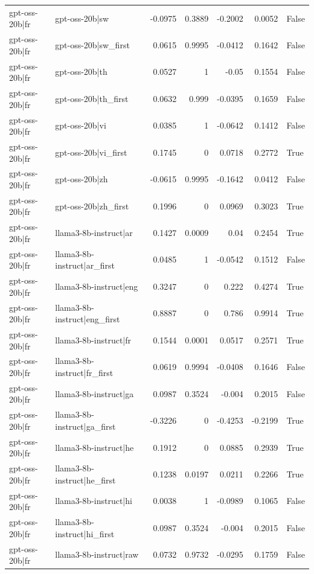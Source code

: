 \begin{table}
\begin{tabular}{l l r r r r l}
gpt-oss-20b|fr & gpt-oss-20b|sw & -0.0975 & 0.3889 & -0.2002 & 0.0052 & False \\
gpt-oss-20b|fr & gpt-oss-20b|sw_first & 0.0615 & 0.9995 & -0.0412 & 0.1642 & False \\
gpt-oss-20b|fr & gpt-oss-20b|th & 0.0527 & 1 & -0.05 & 0.1554 & False \\
gpt-oss-20b|fr & gpt-oss-20b|th_first & 0.0632 & 0.999 & -0.0395 & 0.1659 & False \\
gpt-oss-20b|fr & gpt-oss-20b|vi & 0.0385 & 1 & -0.0642 & 0.1412 & False \\
gpt-oss-20b|fr & gpt-oss-20b|vi_first & 0.1745 & 0 & 0.0718 & 0.2772 & True \\
gpt-oss-20b|fr & gpt-oss-20b|zh & -0.0615 & 0.9995 & -0.1642 & 0.0412 & False \\
gpt-oss-20b|fr & gpt-oss-20b|zh_first & 0.1996 & 0 & 0.0969 & 0.3023 & True \\
gpt-oss-20b|fr & llama3-8b-instruct|ar & 0.1427 & 0.0009 & 0.04 & 0.2454 & True \\
gpt-oss-20b|fr & llama3-8b-instruct|ar_first & 0.0485 & 1 & -0.0542 & 0.1512 & False \\
gpt-oss-20b|fr & llama3-8b-instruct|eng & 0.3247 & 0 & 0.222 & 0.4274 & True \\
gpt-oss-20b|fr & llama3-8b-instruct|eng_first & 0.8887 & 0 & 0.786 & 0.9914 & True \\
gpt-oss-20b|fr & llama3-8b-instruct|fr & 0.1544 & 0.0001 & 0.0517 & 0.2571 & True \\
gpt-oss-20b|fr & llama3-8b-instruct|fr_first & 0.0619 & 0.9994 & -0.0408 & 0.1646 & False \\
gpt-oss-20b|fr & llama3-8b-instruct|ga & 0.0987 & 0.3524 & -0.004 & 0.2015 & False \\
gpt-oss-20b|fr & llama3-8b-instruct|ga_first & -0.3226 & 0 & -0.4253 & -0.2199 & True \\
gpt-oss-20b|fr & llama3-8b-instruct|he & 0.1912 & 0 & 0.0885 & 0.2939 & True \\
gpt-oss-20b|fr & llama3-8b-instruct|he_first & 0.1238 & 0.0197 & 0.0211 & 0.2266 & True \\
gpt-oss-20b|fr & llama3-8b-instruct|hi & 0.0038 & 1 & -0.0989 & 0.1065 & False \\
gpt-oss-20b|fr & llama3-8b-instruct|hi_first & 0.0987 & 0.3524 & -0.004 & 0.2015 & False \\
gpt-oss-20b|fr & llama3-8b-instruct|raw & 0.0732 & 0.9732 & -0.0295 & 0.1759 & False \\

\end{tabular}
\end{table}
